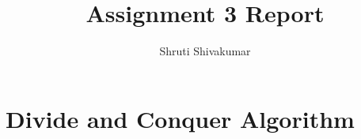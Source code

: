 \documentclass[10pt,a4paper]{article}
\title{Assignment 3 Report}
\author{Shruti Shivakumar}
\begin{document}
\maketitle

\section*{Divide and Conquer Algorithm}
\end{document}
